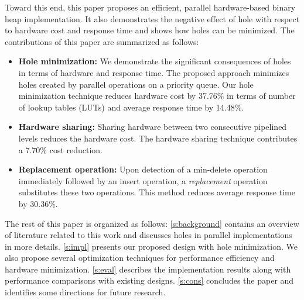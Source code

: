 Toward this end, this paper proposes an efficient, parallel hardware-based binary heap implementation. It also demonstrates the negative effect of hole with respect to hardware cost and response time and shows how holes can be minimized. 
The contributions of this paper are summarized as follows:
\begin{itemize}
\item {\bf Hole minimization:} We demonstrate the significant consequences of holes in terms of hardware and response time. The proposed approach minimizes holes created by parallel operations on a priority queue. Our hole minimization technique reduces hardware cost by 37.76\% in terms of number of lookup tables (LUTs) and average response time by 14.48\%.
\item {\bf Hardware sharing:} Sharing hardware between two consecutive pipelined levels reduces the hardware cost. The hardware sharing technique contributes a 7.70\% cost reduction.
\item {\bf Replacement operation:} Upon detection of a min-delete operation immediately followed by an insert operation, a {\it replacement} operation substitutes these two operations. This method reduces average response time by 30.36\%.
\end{itemize}

The rest of this paper is organized as follows:
\autoref{s:background} contains an overview of literature related to this work and discusses holes in parallel implementations in more details.
\autoref{s:impl} presents our proposed design with hole minimization. 
We also propose several optimization techniques for performance efficiency and hardware minimization.
\autoref{s:eval} describes the implementation results along with performance comparisons with existing designs.
\autoref{s:cons} concludes the paper and identifies some directions for future research.
